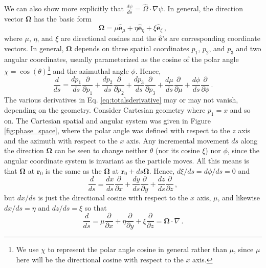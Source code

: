 We can also show more explicitly that $\frac{d\psi}{ds} = \hat{\Omega} \cdot \nabla \psi$.  In general, the direction vector $\mathbf{\Omega}$ has the basic form
\begin{equation}
 \mathbf{\Omega} = \mu \mathbf{\hat{e}}_{\mu} + \eta \mathbf{\hat{e}}_{\eta} + \xi \mathbf{\hat{e}}_{\xi} \, ,
\end{equation}
where $\mu$, $\eta$, and $\xi$ are directional cosines and the $\mathbf{\hat{e}}$'s are corresponding coordinate vectors.  In general, $\mathbf{\Omega}$ depends on three spatial coordinates $p_1$, $p_2$, and $p_3$ and two angular coordinates, usually parameterized as the cosine of the polar angle $\chi = \cos(\theta)$\footnote{We use $\chi$ to represent the polar angle cosine in general rather than $\mu$, since $\mu$ here will be the directional cosine with respect to the $x$ axis.} and the azimuthal angle $\phi$.  Hence,
\begin{equation}
 \frac{d}{ds} = \frac{dp_1}{ds}\frac{\partial}{\partial p_1} + \frac{dp_2}{ds}\frac{\partial}{\partial p_2} + \frac{dp_3}{ds}\frac{\partial}{\partial p_3} + \frac{d\mu}{ds}\frac{\partial}{\partial \mu} + \frac{d\phi}{ds}\frac{\partial}{\partial \phi} \, .
 \label{eq:totalsderivative}
\end{equation}
The various derivatives in Eq. \ref{eq:totalsderivative} may or may not vanish, depending on the geometry.  Consider Cartesian geometry where $p_1 = x$ and so on.  The Cartesian spatial and angular system was given in Figure \ref{fig:phase_space}, where the polar angle was defined with respect to the $z$ axis and the azimuth with respect to the $x$ axis.  Any incremental movement $ds$ along the direction $\mathbf{\Omega}$ can be seen  to change neither $\theta$ (nor its cosine $\xi$) nor $\phi$, since the angular coordinate system is invariant as the particle moves.  All this means is that $\mathbf{\Omega}$ at $\mathbf{r}_0$ is the same as the $\mathbf{\Omega}$ at $\mathbf{r}_0 + ds\mathbf{\Omega}$.  Hence, $d\xi/ds = d\phi/ds = 0$ and
\begin{equation}
 \frac{d}{ds} = \frac{dx}{ds}\frac{\partial}{\partial x} + \frac{dy}{ds}\frac{\partial}{\partial y} + \frac{dz}{ds}\frac{\partial}{\partial z} \, ,
\end{equation}
but $dx/ds$ is just the directional cosine with respect to the $x$ axis, $\mu$, and likewise $dx/ds = \eta$ and $dz/ds = \xi$ so that
\begin{equation}
 \frac{d}{ds} = \mu \frac{\partial}{\partial x} + \eta \frac{\partial}{\partial y} + \xi \frac{\partial}{\partial z} = \mathbf{\Omega} \cdot \nabla  \, .
\end{equation}

